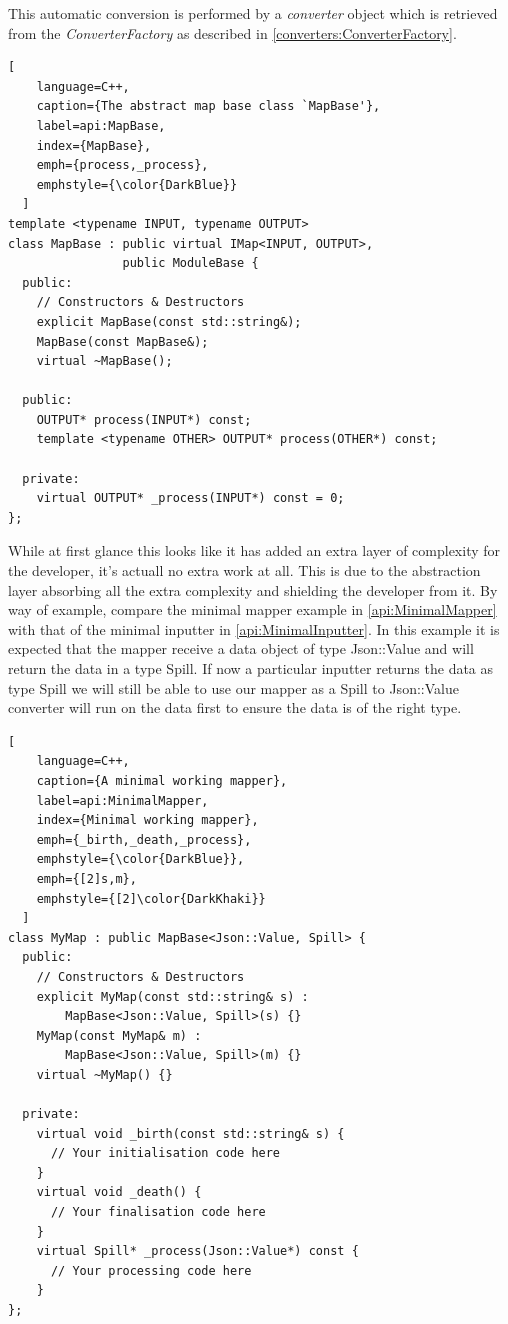 This automatic conversion is performed by a \emph{converter} object which is retrieved from the \emph{ConverterFactory} as described in \ref{converters:ConverterFactory}.
\begin{lstlisting}[
    language=C++,
    caption={The abstract map base class `MapBase'},
    label=api:MapBase, 
    index={MapBase},
    emph={process,_process},
    emphstyle={\color{DarkBlue}}
  ]
template <typename INPUT, typename OUTPUT>
class MapBase : public virtual IMap<INPUT, OUTPUT>,
                public ModuleBase {
  public:
    // Constructors & Destructors
    explicit MapBase(const std::string&);
    MapBase(const MapBase&);
    virtual ~MapBase();

  public:
    OUTPUT* process(INPUT*) const;
    template <typename OTHER> OUTPUT* process(OTHER*) const;

  private:
    virtual OUTPUT* _process(INPUT*) const = 0;
};
\end{lstlisting}

While at first glance this looks like it has added an extra layer of complexity for the developer, it's actuall no extra work at all. This is due to the abstraction layer absorbing all the extra complexity and shielding the developer from it. By way of example, compare the minimal mapper example in \ref{api:MinimalMapper} with that of the minimal inputter in \ref{api:MinimalInputter}. In this example it is expected that the mapper receive a data object of type Json::Value and will return the data in a type Spill. If now a particular inputter returns the data as type Spill we will still be able to use our mapper as a Spill to Json::Value converter will run on the data first to ensure the data is of the right type.
\begin{lstlisting}[
    language=C++,
    caption={A minimal working mapper},
    label=api:MinimalMapper,
    index={Minimal working mapper},
    emph={_birth,_death,_process},
    emphstyle={\color{DarkBlue}},
    emph={[2]s,m},
    emphstyle={[2]\color{DarkKhaki}}
  ]
class MyMap : public MapBase<Json::Value, Spill> {
  public:
    // Constructors & Destructors
    explicit MyMap(const std::string& s) :
        MapBase<Json::Value, Spill>(s) {}
    MyMap(const MyMap& m) :
        MapBase<Json::Value, Spill>(m) {}
    virtual ~MyMap() {}

  private:
    virtual void _birth(const std::string& s) {
      // Your initialisation code here
    }
    virtual void _death() {
      // Your finalisation code here
    }
    virtual Spill* _process(Json::Value*) const {
      // Your processing code here
    }
};
\end{lstlisting}

